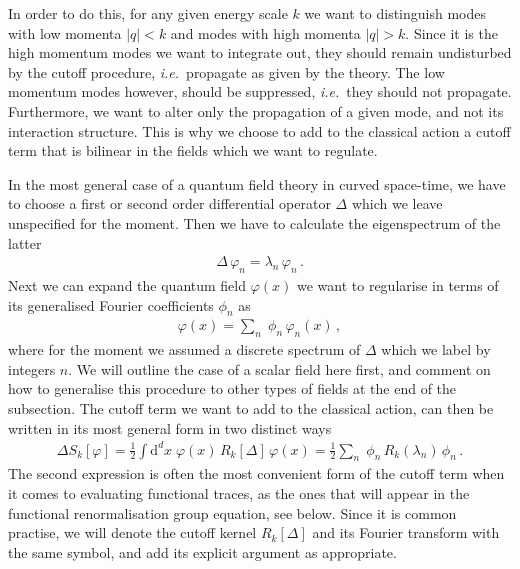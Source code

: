 \documentclass[11pt]{book}
\newcommand\ie{\textit{i.e.}\ }
\numberwithin{equation}{chapter}
\begin{document}
In order to do this, for any given energy scale $k$ we want to distinguish
modes with low momenta $|q|<k$ and modes with high momenta $|q|>k$.
Since it is the high momentum modes we want to integrate out, they should
remain undisturbed by the cutoff procedure, \ie propagate as given by
the theory. The low momentum modes however, should be suppressed,
\ie they should not propagate. Furthermore, we want to
alter only the propagation of a given mode, and not its interaction structure.
This is why we choose to add to the classical action a cutoff term that is
bilinear in the fields which we want to regulate.

In the most general case of a quantum field theory in curved space-time,
we have to choose a first or second order differential operator $\Delta$
which we leave unspecified for the moment.
Then we have to calculate the eigenspectrum of the latter
\begin{align}
  \Delta \, \varphi_n = \lambda_n \, \varphi_n \,.
\end{align}
Next we can expand the quantum field $\varphi(x)$ we want to regularise in terms
of its generalised Fourier coefficients $\phi_n$ as
\begin{align}
  \varphi (x) = \sum_n \; \phi_n \, \varphi_n(x) \,,
\end{align}
where for the moment we assumed a discrete spectrum of $\Delta$
which we label by integers $n$.
We will outline the case of a scalar field here first,
and comment on how to generalise this procedure to other types of fields
at the end of the subsection. The cutoff term we want to add to the classical
action, can then be written in its most general form in two distinct ways
\begin{align}
  \Delta S_k [\varphi]
  = \frac 12 \int \mathrm d^dx \;
  \varphi(x) \, R_k[ \Delta ] \, \varphi(x)
  = \frac 12 \sum_n \;
  \phi_n \, R_k(\lambda_n) \, \phi_n \,.
\end{align}
The second expression is often the most convenient form of the cutoff
term when it comes to evaluating functional traces, as the ones that
will appear in the functional renormalisation group equation, see below.
Since it is common practise,
we will denote the cutoff kernel $R_k[ \Delta ]$
and its Fourier transform with the same symbol, and add its
explicit argument as appropriate.
\end{document}
